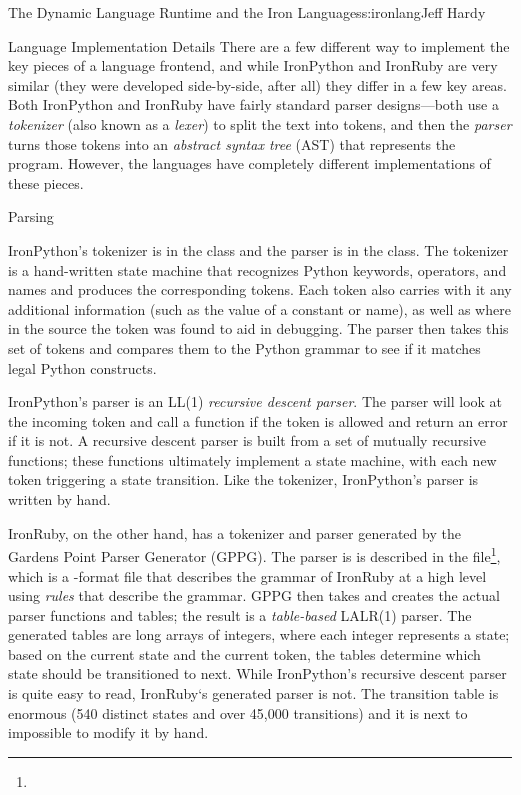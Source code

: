 \begin{aosachapter}{The Dynamic Language Runtime and the Iron Languages}{s:ironlang}{Jeff Hardy}
\begin{aosasect1}{Language Implementation Details}
There are a few different way to implement the key pieces of a language
frontend, and while IronPython and IronRuby are very similar (they were
developed side-by-side, after all) they differ in a few key areas. Both
IronPython and IronRuby have fairly standard parser designs---both use a
\emph{tokenizer} (also known as a \emph{lexer}) to split the text into tokens,
and then the \emph{parser} turns those tokens into an \emph{abstract syntax
tree} (AST) that represents the program. However, the languages have completely
different implementations of these pieces.

\end{aosasect1}

\begin{aosasect1}{Parsing}

IronPython's tokenizer is in the  class and
the parser is in the  class. The tokenizer is
a hand-written state machine that recognizes Python keywords, operators, and
names and produces the corresponding tokens. Each token also carries with it
any additional information (such as the value of a constant or name), as well
as where in the source the token was found to aid in debugging. The parser then
takes this set of tokens and compares them to the Python grammar to see if it
matches legal Python constructs.

IronPython's parser is an LL(1) \emph{recursive descent parser}. The parser
will look at the incoming token and call a function if the token is allowed and
return an error if it is not. A recursive descent parser is built from a set of
mutually recursive functions; these functions ultimately implement a state
machine, with each new token triggering a state transition. Like the tokenizer,
IronPython's parser is written by hand.

IronRuby, on the other hand, has a tokenizer and parser generated by the
Gardens Point Parser Generator (GPPG). The parser is is described in the
file\footnote{}, which is a
-format file that describes the grammar of IronRuby at a high level
using \emph{rules} that describe the grammar. GPPG then takes 
and creates the actual parser functions and tables; the result is a
\emph{table-based} LALR(1) parser. The generated tables are long arrays of
integers, where each integer represents a state; based on the current state and
the current token, the tables determine which state should be transitioned to
next. While IronPython's recursive descent parser is quite easy to read,
IronRuby`s generated parser is not. The transition table is enormous (540
distinct states and over 45,000 transitions) and it is next to impossible to
modify it by hand.


\end{aosasect1}
\end{aosachapter}
